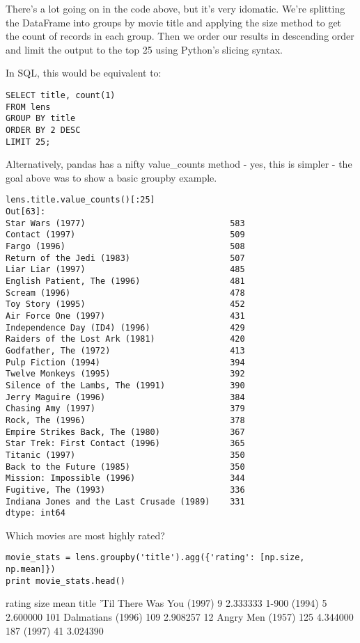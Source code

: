 \documentclass[11pt]{article} %
\begin{document}
There's a lot going on in the code above, but it's very idomatic. We're splitting the DataFrame into groups by movie title and applying the size method to get the count of records in each group. Then we order our results in descending order and limit the output to the top 25 using Python's slicing syntax.

In SQL, this would be equivalent to:

\begin{framed}
\begin{verbatim}
SELECT title, count(1)
FROM lens
GROUP BY title
ORDER BY 2 DESC
LIMIT 25;
\end{verbatim}
\end{framed}
Alternatively, pandas has a nifty value_counts method - yes, this is simpler - the goal above was to show a basic groupby example.

\begin{verbatim}
lens.title.value_counts()[:25]
Out[63]:
Star Wars (1977)                             583
Contact (1997)                               509
Fargo (1996)                                 508
Return of the Jedi (1983)                    507
Liar Liar (1997)                             485
English Patient, The (1996)                  481
Scream (1996)                                478
Toy Story (1995)                             452
Air Force One (1997)                         431
Independence Day (ID4) (1996)                429
Raiders of the Lost Ark (1981)               420
Godfather, The (1972)                        413
Pulp Fiction (1994)                          394
Twelve Monkeys (1995)                        392
Silence of the Lambs, The (1991)             390
Jerry Maguire (1996)                         384
Chasing Amy (1997)                           379
Rock, The (1996)                             378
Empire Strikes Back, The (1980)              367
Star Trek: First Contact (1996)              365
Titanic (1997)                               350
Back to the Future (1985)                    350
Mission: Impossible (1996)                   344
Fugitive, The (1993)                         336
Indiana Jones and the Last Crusade (1989)    331
dtype: int64
\end{verbatim}
Which movies are most highly rated?


\begin{framed}
\begin{verbatim}
movie_stats = lens.groupby('title').agg({'rating': [np.size, np.mean]})
print movie_stats.head()
\end{verbatim}
\end{framed}
                           rating          
                             size      mean
title                                      
'Til There Was You (1997)       9  2.333333
1-900 (1994)                    5  2.600000
101 Dalmatians (1996)         109  2.908257
12 Angry Men (1957)           125  4.344000
187 (1997)                     41  3.024390
\end{document}
